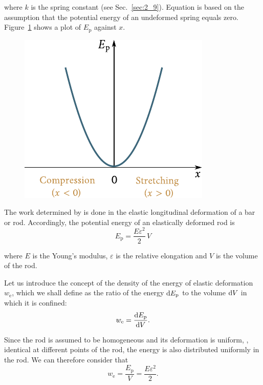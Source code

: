 \noindent
where $k$ is the spring constant (see Sec.~\ref{sec:2_9}). Equation  is based on the assumption that the potential energy of an undeformed spring equals zero. Figure~\ref{fig:3_13} shows a plot of $E_{\text{p}}$ against $x$.

\begin{figure}[t]
	\begin{center}
		\includegraphics[scale=1]{figures/ch_03/fig_3_13.pdf}
		\caption[]{}
		\label{fig:3_13}
	\end{center}
	\vspace{-0.7cm}
\end{figure}

The work determined by  is done in the elastic longitudinal deformation of a bar or rod. Accordingly, the potential energy of an elastically deformed rod is
\begin{equation}\label{eq:3_79}
E_{\text{p}} = \frac{E\varepsilon^2}{2}\,V
\end{equation}

\noindent
where $E$ is the Young's modulus, $\varepsilon$ is the relative elongation and $V$ is the volume of the rod.

Let us introduce the concept of the density of the energy of elastic deformation $w_{\text{e}}$, which we shall define as the ratio of the energy $\mathrm{d} E_{\text{p}}$ to the volume $\mathrm{d} V$ in which it is confined:
\begin{equation}\label{eq:3_80}
w_{\text{e}} = \frac{\mathrm{d} E_{\text{p}}}{\mathrm{d} V}.
\end{equation}

\noindent
Since the rod is assumed to be homogeneous and its deformation is uniform, \ie, identical at different points of the rod, the energy  is also distributed uniformly in the rod. We can therefore consider that
\begin{equation}\label{eq:3_81}
w_{\text{e}} = \frac{E_{\text{p}}}{V} = \frac{E\varepsilon^2}{2}.
\end{equation}

